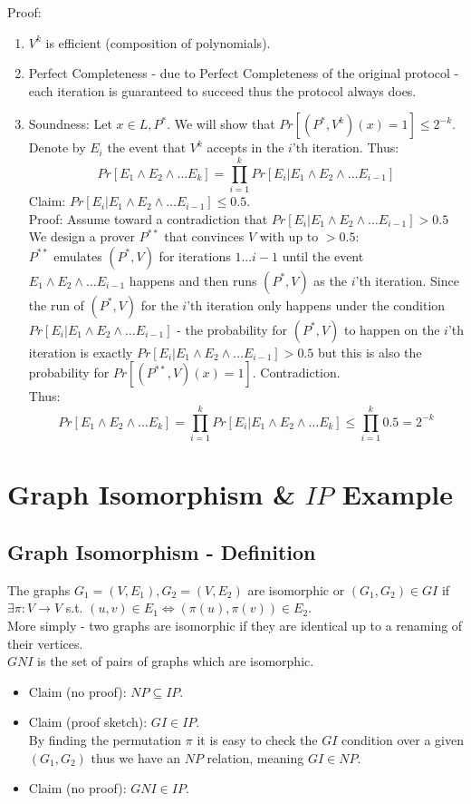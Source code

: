 Proof:
\begin{enumerate}
    \item $V^k$ is efficient  (composition of polynomials).
    \item Perfect Completeness - due to Perfect  Completeness of the original protocol - each iteration is guaranteed to succeed thus the protocol always does.
    \item Soundness: Let $x\in L, P^*$. We will show that $Pr[(P^*, V^k)(x)=1]\leq 2^{-k}$.
    Denote by $E_i$ the event that $V^k$ accepts in the $i$'th iteration. Thus:
    \[
        Pr[E_1\wedge E_2\wedge\dots E_k]=\prod_{i=1}^kPr[E_i|E_1\wedge E_2\wedge\dots E_{i-1}]
    \]
    Claim: $Pr[E_i|E_1\wedge E_2\wedge\dots E_{i-1}]\leq 0.5$.\\
    Proof: Assume toward a contradiction that $Pr[E_i|E_1\wedge E_2\wedge\dots E_{i-1}]>0.5$
    We design a prover $P^{**}$ that convinces $V$ with up to $>0.5$:\\
    $P^{**}$ emulates $(P^*, V)$ for iterations $1...i-1$ until the event
    $E_1\wedge E_2\wedge\dots E_{i-1}$ happens and then runs $(P^*,V)$ as the $i$'th iteration.
    Since the run of $(P^*,V)$ for the $i$'th iteration only happens under the condition
    $Pr[E_i|E_1\wedge E_2\wedge\dots E_{i-1}]$ - the probability for $(P^*,V)$
    to happen on the $i$'th iteration is exactly $Pr[E_i|E_1\wedge E_2\wedge\dots E_{i-1}]>0.5$
    but this is also the probability for $Pr[(P^{**},V)(x)=1]$. Contradiction.\\
    
    Thus:
    \[
        Pr[E_1\wedge E_2\wedge\dots E_k]=\prod_{i=1}^kPr[E_i|E_1\wedge E_2\wedge\dots E_k]\leq \prod_{i=1}^k0.5=2^{-k}
    \]
\end{enumerate}

\section*{Graph Isomorphism \& $IP$ Example}
\subsection*{Graph Isomorphism - Definition}
The graphs $G_1=(V,E_1), G_2=(V,E_2)$ are isomorphic or $(G_1,G_2)\in GI$ if $\exists\pi:V\longrightarrow V$ s.t. $(u,v)\in E_1 \iff (\pi(u), \pi(v))\in E_2$.\\
More simply - two graphs are isomorphic if they are identical up to a renaming of their vertices.\\

$GNI$ is the set of pairs of graphs which are isomorphic.\\
\begin{itemize}
    \item Claim (no proof): $NP\subseteq IP$.\\
    \item Claim (proof sketch): $GI\in IP$.\\
    By finding the permutation $\pi$ it is easy to check the $GI$ condition over a given $(G_1,G_2)$ thus we have an $NP$ relation, meaning $GI\in NP$.\\
    \item Claim (no proof): $GNI\in IP$.
\end{itemize}